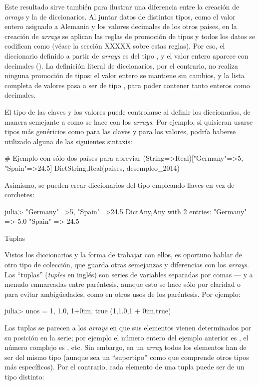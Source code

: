 ﻿\documentclass[spanish]{article}
\begin{document}
{{Este resultado sirve también para ilustrar una diferencia entre la creación de \emph{arrays} y la de diccionarios. Al juntar datos de distintos tipos, como el valor entero  asignado a Alemania y los valores decimales de los otros países, en la creación de \emph{arrays} se aplican las reglas de promoción de tipos y todos los datos se codifican como  (véase la sección XXXXX sobre estas reglas). Por eso, el diccionario definido a partir de \emph{arrays} es del tipo , y el valor entero aparece con decimales (). La definición literal de diccionarios, por el contrario, no realiza ninguna promoción de tipos: el valor entero se mantiene sin cambios, y la lista completa de valores pasa a ser de tipo , para poder contener tanto enteros como decimales.

El tipo de las claves y los valores puede controlarse al definir los diccionarios, de manera semejante a como se hace con los \emph{arrays}. Por ejemplo, si quisieran usarse tipos más genéricios como  para las claves y  para los valores, podría haberse utilizado alguna de las siguientes sintaxis:

# Ejemplo con sólo dos países para abreviar
(String=>Real)["Germany"=>5, "Spain"=>24.5]
Dict{String,Real}(paises, desempleo_2014)

Asimismo, se pueden crear diccionarios del tipo  empleando llaves en vez de corchetes:

julia> {"Germany"=>5, "Spain"=>24.5} 
Dict{Any,Any} with 2 entries:
  "Germany" => 5.0
  "Spain"   => 24.5


Tuplas

Vistos los diccionarios y la forma de trabajar con ellos, es oportuno hablar de otro tipo de colección, que guarda otras semejanzas y diferencias con los \emph{arrays}. Las ``tuplas'' (\emph{tuples} en inglés) son series de variables separadas por comas --- y a menudo enmarcadas entre paréntesis, aunque esto se hace sólo por claridad o para evitar ambigüedades, como en otros usos de los paréntesis. Por ejemplo:

julia> unos = 1, 1.0, 1+0im, true
(1,1.0,1 + 0im,true)

Las tuplas se parecen a los \emph{arrays} en que sus elementos vienen determinados por su posición en la serie; por ejemplo el número entero del ejemplo anterior es , el número complejo es , etc. Sin embargo, en un \emph{array} todos los elementos han de ser del mismo tipo (aunque sea un ``supertipo'' como  que comprende otros tipos más específicos). Por el contrario, cada elemento de una tupla puede ser de un tipo distinto: 

}}
\end{document}
